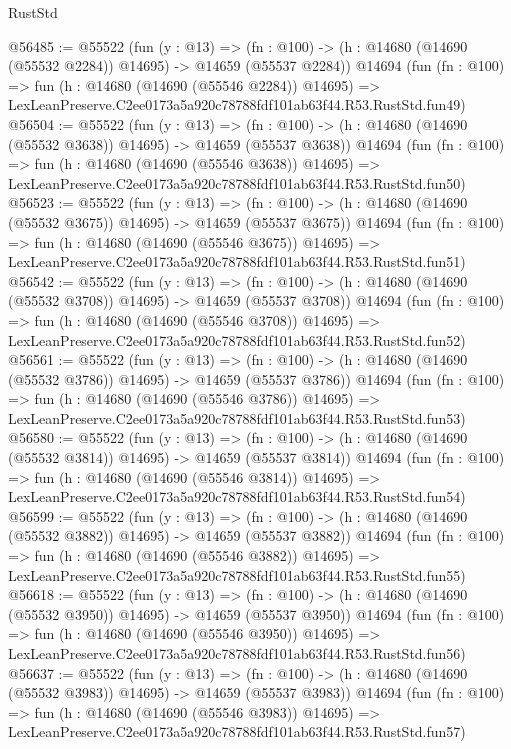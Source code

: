 \begin{lexlean}{RustStd}
\begin{coremodule}
@56485 := @55522
    (fun (y : @13) =>
    (fn : @100) -> (h : @14680 (@14690 (@55532 @2284)) @14695) -> @14659 (@55537 @2284))
    @14694
    (fun (fn : @100) =>
    fun (h : @14680 (@14690 (@55546 @2284)) @14695) =>
    LexLeanPreserve.C2ee0173a5a920c78788fdf101ab63f44.R53.RustStd.fun49)
@56504 := @55522
    (fun (y : @13) =>
    (fn : @100) -> (h : @14680 (@14690 (@55532 @3638)) @14695) -> @14659 (@55537 @3638))
    @14694
    (fun (fn : @100) =>
    fun (h : @14680 (@14690 (@55546 @3638)) @14695) =>
    LexLeanPreserve.C2ee0173a5a920c78788fdf101ab63f44.R53.RustStd.fun50)
@56523 := @55522
    (fun (y : @13) =>
    (fn : @100) -> (h : @14680 (@14690 (@55532 @3675)) @14695) -> @14659 (@55537 @3675))
    @14694
    (fun (fn : @100) =>
    fun (h : @14680 (@14690 (@55546 @3675)) @14695) =>
    LexLeanPreserve.C2ee0173a5a920c78788fdf101ab63f44.R53.RustStd.fun51)
@56542 := @55522
    (fun (y : @13) =>
    (fn : @100) -> (h : @14680 (@14690 (@55532 @3708)) @14695) -> @14659 (@55537 @3708))
    @14694
    (fun (fn : @100) =>
    fun (h : @14680 (@14690 (@55546 @3708)) @14695) =>
    LexLeanPreserve.C2ee0173a5a920c78788fdf101ab63f44.R53.RustStd.fun52)
@56561 := @55522
    (fun (y : @13) =>
    (fn : @100) -> (h : @14680 (@14690 (@55532 @3786)) @14695) -> @14659 (@55537 @3786))
    @14694
    (fun (fn : @100) =>
    fun (h : @14680 (@14690 (@55546 @3786)) @14695) =>
    LexLeanPreserve.C2ee0173a5a920c78788fdf101ab63f44.R53.RustStd.fun53)
@56580 := @55522
    (fun (y : @13) =>
    (fn : @100) -> (h : @14680 (@14690 (@55532 @3814)) @14695) -> @14659 (@55537 @3814))
    @14694
    (fun (fn : @100) =>
    fun (h : @14680 (@14690 (@55546 @3814)) @14695) =>
    LexLeanPreserve.C2ee0173a5a920c78788fdf101ab63f44.R53.RustStd.fun54)
@56599 := @55522
    (fun (y : @13) =>
    (fn : @100) -> (h : @14680 (@14690 (@55532 @3882)) @14695) -> @14659 (@55537 @3882))
    @14694
    (fun (fn : @100) =>
    fun (h : @14680 (@14690 (@55546 @3882)) @14695) =>
    LexLeanPreserve.C2ee0173a5a920c78788fdf101ab63f44.R53.RustStd.fun55)
@56618 := @55522
    (fun (y : @13) =>
    (fn : @100) -> (h : @14680 (@14690 (@55532 @3950)) @14695) -> @14659 (@55537 @3950))
    @14694
    (fun (fn : @100) =>
    fun (h : @14680 (@14690 (@55546 @3950)) @14695) =>
    LexLeanPreserve.C2ee0173a5a920c78788fdf101ab63f44.R53.RustStd.fun56)
@56637 := @55522
    (fun (y : @13) =>
    (fn : @100) -> (h : @14680 (@14690 (@55532 @3983)) @14695) -> @14659 (@55537 @3983))
    @14694
    (fun (fn : @100) =>
    fun (h : @14680 (@14690 (@55546 @3983)) @14695) =>
    LexLeanPreserve.C2ee0173a5a920c78788fdf101ab63f44.R53.RustStd.fun57)

\end{coremodule}
\end{lexlean}
